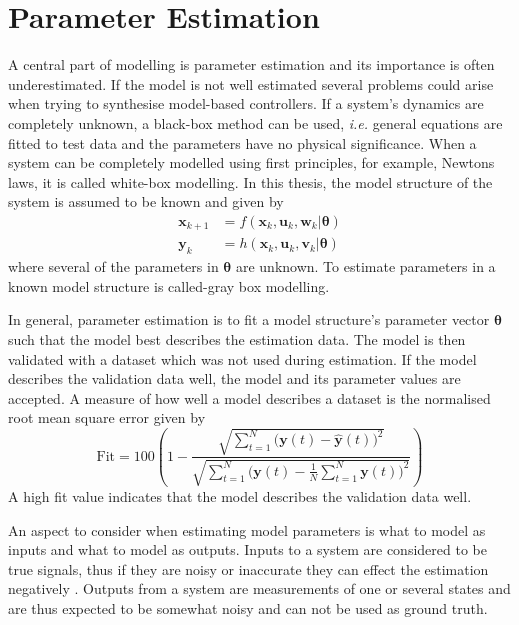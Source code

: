 \chapter{Parameter Estimation} \label{cha:parameterEstimation}
A central part of modelling is parameter estimation and its importance is often underestimated. If the model is not well estimated several problems could arise when trying to synthesise model-based controllers. If a system's dynamics are completely unknown, a black-box method can be used, \emph{i.e.} general equations are fitted to test data and the parameters have no physical significance. When a system can be completely modelled using first principles, for example, Newtons laws, it is called white-box modelling. In this thesis, the model structure of the system is assumed to be known and given by
\begin{align}
\boldsymbol{x}_{k+1} &=f(\boldsymbol{x}_k,\boldsymbol{u}_k,\boldsymbol{w}_k|\boldsymbol{\theta})\\
\boldsymbol{y}_{k} &= h(\boldsymbol{x}_k,\boldsymbol{u}_k,\boldsymbol{v}_k|\boldsymbol{\theta})
\end{align}
where several of the parameters in $\boldsymbol{\theta}$ are unknown.
To estimate parameters in a known model structure is called-gray box modelling. 

In general, parameter estimation is to fit a model structure's parameter vector $\boldsymbol{\theta}$ such that the model best describes the estimation data. The model is then validated with a dataset which was not used during estimation. If the model describes the validation data well, the model and its parameter values are accepted. A measure of how well a model describes a dataset is the normalised root mean square error given by
\begin{equation}
\text{Fit} = 100 \left(1 - \frac{\sqrt{\sum\limits_{t=1}^N \bigr(\boldsymbol{y}(t) - \hat{\boldsymbol{y}}(t)\bigl)^2}}{\sqrt{\sum\limits_{t=1}^N \bigr(\boldsymbol{y}(t)-\frac{1}{N}\sum\limits_{t=1}^N \boldsymbol{y}(t)\bigl)^2}}\right)
\end{equation}%
A high fit value indicates that the model describes the validation data well.

An aspect to consider when estimating model parameters is what to model as inputs and what to model as outputs. Inputs to a system are considered to be true signals, thus if they are noisy or inaccurate they can effect the estimation negatively \citep{modellbygge}. Outputs from a system are measurements of one or several states and are thus expected to be somewhat noisy and can not be used as ground truth. 

